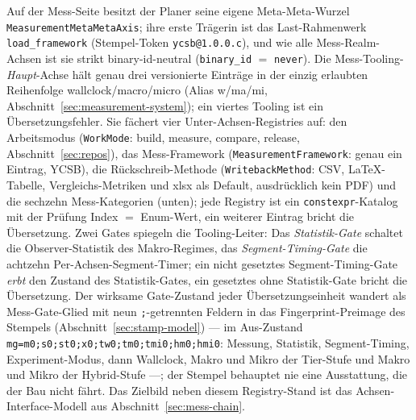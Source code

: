\begin{nurkurz}
Auf der Mess-Seite besitzt der Planer seine eigene Meta-Meta-Wurzel \texttt{MeasurementMetaMetaAxis}; ihre
erste Trägerin ist das Last-Rahmenwerk \texttt{load\_framework} (Stempel-Token \texttt{ycsb@1.0.0.c}), und
wie alle Mess-Realm-Achsen ist sie strikt binary-id-neutral (\texttt{binary\_id} $=$ \texttt{never}). Die
Mess-Tooling-\emph{Haupt}-Achse hält genau drei versionierte Einträge in der einzig erlaubten Reihenfolge
wallclock/macro/micro (Alias w/ma/mi, Abschnitt~\ref{sec:measurement-system}); ein viertes Tooling ist ein
Übersetzungsfehler. Sie fächert vier Unter-Achsen-Registries auf: den Arbeitsmodus (\texttt{WorkMode}:
build, measure, compare, release, Abschnitt~\ref{sec:repos}), das Mess-Framework
(\texttt{MeasurementFramework}: genau ein Eintrag, YCSB), die Rückschreib-Methode
(\texttt{WritebackMethod}: CSV, LaTeX-Tabelle, Vergleichs-Metriken und xlsx als Default, ausdrücklich kein
PDF) und die sechzehn Mess-Kategorien (unten); jede Registry ist ein \texttt{constexpr}-Katalog mit der
Prüfung Index $=$ Enum-Wert, ein weiterer Eintrag bricht die Übersetzung. Zwei Gates spiegeln die
Tooling-Leiter: Das \emph{Statistik-Gate} schaltet die Observer-Statistik des Makro-Regimes, das
\emph{Segment-Timing-Gate} die achtzehn Per-Achsen-Segment-Timer; ein nicht gesetztes Segment-Timing-Gate
\emph{erbt} den Zustand des Statistik-Gates, ein gesetztes ohne Statistik-Gate bricht die Übersetzung. Der
wirksame Gate-Zustand jeder Übersetzungseinheit wandert als Mess-Gate-Glied mit neun \texttt{;}-getrennten
Feldern in das Fingerprint-Preimage des Stempels (Abschnitt~\ref{sec:stamp-model}) --- im Aus-Zustand
\texttt{mg=m0;s0;st0;x0;tw0;tm0;tmi0;hm0;hmi0}: Messung, Statistik, Segment-Timing, Experiment-Modus, dann
Wallclock, Makro und Mikro der Tier-Stufe und Makro und Mikro der Hybrid-Stufe ---; der Stempel behauptet
nie eine Ausstattung, die der Bau nicht fährt. Das Zielbild neben diesem Registry-Stand ist das
Achsen-Interface-Modell aus Abschnitt~\ref{sec:mess-chain}.
\end{nurkurz}

